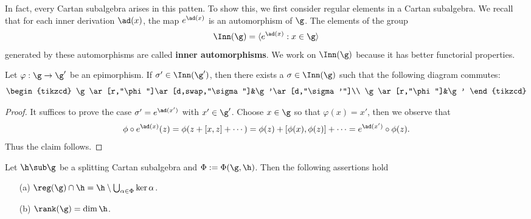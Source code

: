 In fact, every Cartan subalgebra arises in this patten. To show this, we first consider regular elements in a Cartan subalgebra. We recall that for each inner derivation $\ad(x)$, the map $e^{\ad(x)}$ is an automorphism of $\g$. The elements of the group
\[\Inn(\g)=\langle e^{\ad(x)}:x\in\g\rangle\]
generated by these automorphisms are called \textbf{inner automorphisms}. We work on $\Inn(\g)$ because it has better functorial properties.
\begin{proposition}
Let $\varphi:\g\to\g'$ be an epimorphism. If $\sigma'\in\Inn(\g')$, then there exists a $\sigma\in\Inn(\g)$ such that the following diagram commutes:
\[
\begin{tikzcd}
\g\ar[r,"\phi"]\ar[d,swap,"\sigma"]&\g'\ar[d,"\sigma'"]\\
\g\ar[r,"\phi"]&\g'
\end{tikzcd}\]
\end{proposition}
\begin{proof}
It suffices to prove the case $\sigma'=e^{\ad(x')}$ with $x'\in\g'$. Choose $x\in\g$ so that $\varphi(x)=x'$, then we observe that
\[\phi\circ e^{\ad(x)}(z)=\phi(z+[x,z]+\cdots)=\phi(z)+[\phi(x),\phi(z)]+\cdots=e^{\ad(x')}\circ\phi(z).\]
Thus the claim follows.
\end{proof}
\begin{proposition}\label{Lie algebra regular elements in Cartan subalgebra}
Let $\h\sub\g$ be a splitting Cartan subalgebra and $\Phi:=\Phi(\g,\h)$. Then the following assertions hold
\begin{itemize}
\item[(a)] $\reg(\g)\cap\h=\h\setminus\bigcup_{\alpha\in\Phi}\ker\alpha$.
\item[(b)] $\rank(\g)=\dim\h$.
\end{itemize}
\end{proposition}
